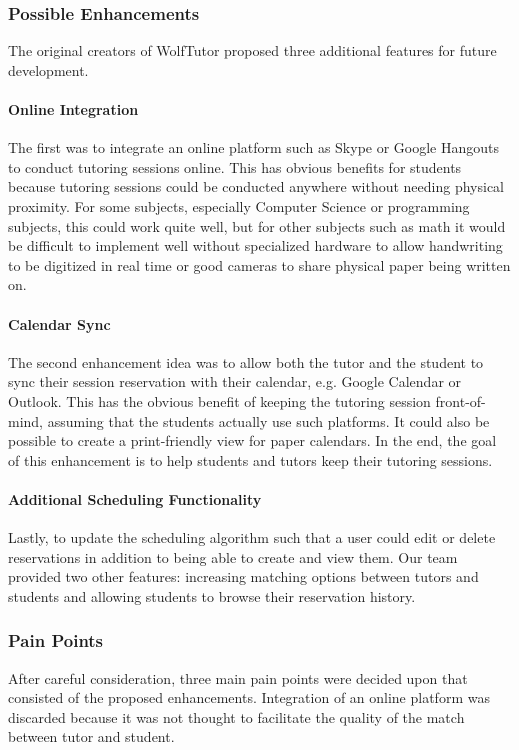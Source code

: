 \subsubsection{Possible Enhancements} 
The original creators of WolfTutor proposed three additional features for future
development. 

\paragraph{Online Integration}
The first was to integrate an online platform such as Skype or
Google Hangouts to conduct tutoring sessions online. This has obvious benefits
for students because tutoring sessions could be conducted anywhere without
needing physical proximity.  For some subjects, especially Computer Science or
programming subjects, this could work quite well, but for other subjects such as
math it would be difficult to implement well without specialized hardware to
allow handwriting to be digitized in real time or good cameras to share physical
paper being written on. 

\paragraph{Calendar Sync}
The second enhancement idea was to allow both the tutor and the student to sync
their session reservation with their calendar, e.g. Google Calendar or Outlook.
This has the obvious benefit of keeping the tutoring session front-of-mind,
assuming that the students actually use such platforms.  It could also be
possible to create a print-friendly view for paper calendars. In the end, the
goal of this enhancement is to help students and tutors keep their tutoring
sessions.  

\paragraph{Additional Scheduling Functionality}
Lastly, to update the scheduling algorithm such that a user could edit or delete
reservations in addition to being able to create and view them. Our team
provided two other features: increasing matching options between tutors and
students and allowing students to browse their reservation history.

\subsubsection{Pain Points}
After careful consideration, three main pain points were decided upon that
consisted of the proposed enhancements. Integration of an online platform was
discarded because it was not thought to facilitate the quality of the match
between tutor and student.

